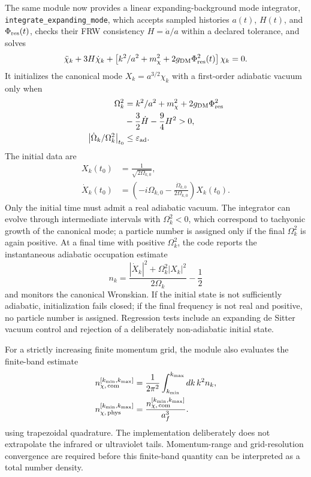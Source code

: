 \documentclass[epj]{svjour}
\begin{document}
\begin{description}
The same module now provides a linear expanding-background mode
integrator, \texttt{integrate\_expanding\_mode}, which accepts sampled
histories \(a(t)\), \(H(t)\), and \(\Phi_{\rm res}(t)\), checks
their FRW consistency \(H=\dot a/a\) within a declared tolerance, and solves
\[
\ddot\chi_k+3H\dot\chi_k+
\left[k^2/a^2+m_\chi^2+
2g_{\rm DM}\Phi_{\rm res}^2(t)\right]\chi_k=0.
\]
It initializes the canonical mode \(X_k=a^{3/2}\chi_k\) with a
first-order adiabatic vacuum only when
\[
\begin{aligned}
\Omega_k^2&=k^2/a^2+m_\chi^2+
2g_{\rm DM}\Phi_{\rm res}^2\nonumber\\
&-\frac32\dot H-\frac94H^2>0,\\
\left|\dot\Omega_k/\Omega_k^2\right|_{t_0}
&\leq \varepsilon_{\rm ad}.
\end{aligned}
\]
The initial data are
\[
\begin{aligned}
X_k(t_0)&=\frac{1}{\sqrt{2\Omega_{k,0}}},\\
\dot X_k(t_0)&=
\left(-i\Omega_{k,0}
-\frac{\dot\Omega_{k,0}}{2\Omega_{k,0}}\right)X_k(t_0).
\end{aligned}
\]
Only the initial time must admit a real adiabatic vacuum. The
integrator can evolve through intermediate intervals with
\(\Omega_k^2<0\), which correspond to tachyonic growth of the
canonical mode; a particle number is assigned only if the final
\(\Omega_k^2\) is again positive. At a final time with positive
\(\Omega_k^2\), the code reports the instantaneous adiabatic occupation estimate
\[
n_k=\frac{|\dot X_k|^2+\Omega_k^2|X_k|^2}{2\Omega_k}-\frac12
\]
and monitors the canonical Wronskian. If the initial state is not
sufficiently adiabatic, initialization fails closed; if the final
frequency is not real and positive, no particle number is assigned.
Regression tests include an expanding de Sitter vacuum control and
rejection of a deliberately non-adiabatic initial state.

For a strictly increasing finite momentum grid, the module also
evaluates the finite-band estimate
\[
\begin{aligned}
n_{\chi,\,\rm com}^{[k_{\min},k_{\max}]}
&=\frac{1}{2\pi^2}
\int_{k_{\min}}^{k_{\max}}dk\,k^2n_k,\\
n_{\chi,\,\rm phys}^{[k_{\min},k_{\max}]}
&=\frac{n_{\chi,\,\rm com}^{[k_{\min},k_{\max}]}}{a_f^3}.
\end{aligned}
\]
using trapezoidal quadrature. The implementation deliberately does
not extrapolate the infrared or ultraviolet tails. Momentum-range
and grid-resolution convergence are required before this finite-band
quantity can be interpreted as a total number density.


\end{description}
\end{document}
